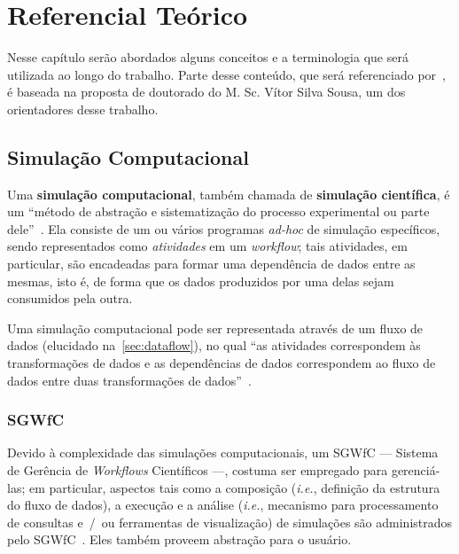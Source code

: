 
\chapter{Referencial Teórico}%
\label{chap:referencial-teorico}


Nesse capítulo serão abordados alguns conceitos e a terminologia que será utilizada ao longo do trabalho. Parte desse conteúdo, que será referenciado por~\cite{silva2015propostadoutorado}, é baseada na proposta de doutorado do \textsf{M. Sc. Vítor Silva Sousa}, um dos orientadores desse trabalho.

\section{Simulação Computacional}

Uma \textbf{simulação computacional}, também chamada de \textbf{simulação científica}, é um ``método de abstração e sistematização do processo experimental ou parte dele''~\cite{silva2015propostadoutorado,dias2015data}. Ela consiste de um ou vários programas \textit{ad-hoc} de simulação específicos, sendo representados como \textit{atividades} em um \textit{workflow}; tais atividades, em particular, são encadeadas para formar uma dependência de dados entre as mesmas, isto é, de forma que os dados produzidos por uma delas sejam consumidos pela outra.

Uma simulação computacional pode ser representada através de um fluxo de dados (elucidado na~\autoref{sec:dataflow}), no qual ``as atividades correspondem às transformações de dados e as dependências de dados correspondem ao fluxo de dados entre duas transformações de dados''~\cite{silva2015propostadoutorado,ogasawara2011algebraic}.

\subsection{SGWfC}

Devido à complexidade das simulações computacionais, um SGWfC --- Sistema de Gerência de \textit{Workflows} Científicos ---, costuma ser empregado para gerenciá-las; em particular, aspectos tais como a composição (\textit{i.e.}, definição da estrutura do fluxo de dados), a execução e a análise (\textit{i.e.}, mecanismo para processamento de consultas e~/~ou ferramentas de visualização) de simulações são administrados pelo SGWfC~\cite{silva2015propostadoutorado}. Eles também proveem abstração para o usuário.

